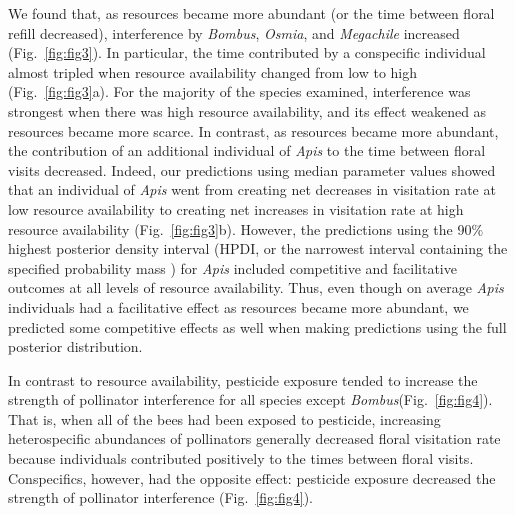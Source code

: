 \begin{refsection}
We found that, as resources became more abundant (or the time between floral refill decreased), interference by \textit{Bombus}, \textit{Osmia}, and \textit{Megachile} increased (Fig.~\ref{fig:fig3}). In particular, the time contributed by a conspecific individual almost tripled when resource availability changed from low to high (Fig.~\ref{fig:fig3}a). For the majority of the species examined, interference was strongest when there was high resource availability, and its effect weakened as resources became more scarce. In contrast, as resources became more abundant, the contribution of an additional individual of \textit{Apis} to the time between floral visits decreased. Indeed, our predictions using median parameter values showed that an individual of \textit{Apis} went from creating net decreases in visitation rate at low resource availability to creating net increases in visitation rate at high resource availability (Fig.~\ref{fig:fig3}b). However, the predictions using the 90\% highest posterior density interval (HPDI, or the narrowest interval containing the specified probability mass \citep{mcelreath_statistical_2018}) for \textit{Apis} included competitive and facilitative outcomes at all levels of resource availability. Thus, even though on average \textit{Apis} individuals had a facilitative effect as resources became more abundant, we predicted some competitive effects as well when making predictions using the full posterior distribution.

In contrast to resource availability, pesticide exposure tended to increase the strength of pollinator interference for all species except \textit{Bombus}(Fig.~\ref{fig:fig4}). That is, when all of the bees had been exposed to pesticide, increasing heterospecific abundances of pollinators generally decreased floral visitation rate because individuals contributed positively to the times between floral visits. Conspecifics, however, had the opposite effect: pesticide exposure decreased the strength of pollinator interference (Fig.~\ref{fig:fig4}).



\end{refsection}

